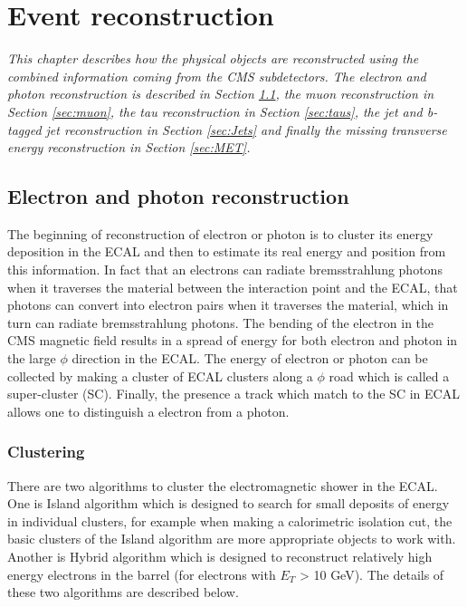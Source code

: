 \chapter{Event reconstruction}\label{chap:Event_reconstruction}
\textit{This chapter describes how the physical objects are reconstructed using the combined information coming from the CMS subdetectors. The electron and photon reconstruction is described in Section \ref{sec:electron_photon}, the muon reconstruction in Section \ref{sec:muon}, the tau reconstruction in Section \ref{sec:taus}, the jet and b-tagged jet reconstruction in Section \ref{sec:Jets} and finally the missing transverse energy reconstruction in Section \ref{sec:MET}.}
\section{Electron and photon reconstruction}\label{sec:electron_photon}
The beginning of reconstruction of electron or photon is to cluster its energy deposition in the ECAL and then to estimate its real energy and position from this information.
In fact that an electrons can radiate bremsstrahlung photons when it traverses the material between the interaction point and the ECAL, that photons can convert into electron pairs when it traverses the material, which in turn can radiate bremsstrahlung photons. The bending of the electron in the CMS magnetic field results in a spread of energy for both electron and photon in the large $\phi$ direction in the ECAL. The energy of electron or photon can be collected by making a cluster of ECAL clusters along a $\phi$ road  which is called a super-cluster (SC).
Finally, the presence a track which match to the SC in ECAL allows one to distinguish a electron from a photon.
\subsection{Clustering}\label{subsec:clustering}

There are two algorithms to cluster the electromagnetic shower in the ECAL. One is Island algorithm which is designed to search for small deposits of energy in individual clusters, for example when making a calorimetric isolation cut, the basic clusters of the Island algorithm are more appropriate objects to work with.
Another is Hybrid algorithm which is designed to reconstruct relatively high energy electrons in the barrel (for electrons with $E_{T}$ > 10 GeV). The details of these two algorithms are described below.

